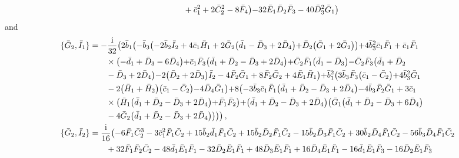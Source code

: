 \documentclass[10pt]{amsart}
\theoremstyle{definition}
\theoremstyle{corollary}
\theoremstyle{remark}
\theoremstyle{conclusion}
\begin{document}
\begin{align}
& \hskip 0.7cm+\bar{c}_1^2+2 \bar{C}_2^2-8 \bar{F}_4\bigl)-32 \bar{E}_1 \bar{D}_2 \bar{F}_3-40 \bar{D}_3^2 \bar{G}_1\bigl) \, \end{align} and \begin{align}
\{\bar{G}_2, \bar{I}_1\}&=-\frac{{\rm i}}{32}  \bigl(2 \bar{b}_1 \bigl(-\bar{b}_3 \bigl(-2 \bar{b}_2 \bar{I}_2+4 \bar{c}_1 \bar{H}_1+2 \bar{G}_2 \bigl(\bar{d}_1-\bar{D}_3+2 \bar{D}_4\bigl)+\bar{D}_2 \bigl(\bar{G}_1+2 \bar{G}_2\bigl)\bigl)+4 \bar{b}_3^2 \bar{c}_1 \bar{F}_1+\bar{c}_1 \bar{F}_1 \nonumber \\
& \hskip 0.7cm \times \bigl(-\bar{d}_1+\bar{D}_3-6 \bar{D}_4\bigl)+\bar{c}_1 \bar{F}_3 \bigl(\bar{d}_1+\bar{D}_2-\bar{D}_3+2 \bar{D}_4\bigl)+\bar{C}_2 \bar{F}_1 \bigl(\bar{d}_1-\bar{D}_3\bigl)-\bar{C}_2 \bar{F}_3\bigl(\bar{d}_1+\bar{D}_2 \nonumber \\
& \hskip 0.7cm -\bar{D}_3+2 \bar{D}_4\bigl)-2 \bigl(\bar{D}_2+2 \bar{D}_3\bigl) \bar{I}_2-4 \bar{F}_2 \bar{G}_1+8 \bar{F}_2 \bar{G}_2+4 \bar{E}_1 \bar{H}_1\bigl)+\bar{b}_1^2 \bigl(3 \bar{b}_3 \bar{F}_3 \bigl(\bar{c}_1-\bar{C}_2\bigl)+4 \bar{b}_3^2 \bar{G}_1 \nonumber \\
& \hskip 0.7cm -2 \bigl(\bar{H}_1+\bar{H}_2\bigl) \bigl(\bar{c}_1-\bar{C}_2\bigl)-4 \bar{D}_4 \bar{G}_1\bigl)+8 \bigl(-3 \bar{b}_3 \bar{c}_1 \bar{F}_1 \bigl(\bar{d}_1+\bar{D}_2-\bar{D}_3+2 \bar{D}_4\bigl)-4 \bar{b}_3 \bar{F}_2 \bar{G}_1+3 \bar{c}_1 \nonumber \\
& \hskip 0.7cm \times \bigl(\bar{H}_1 \bigl(\bar{d}_1+\bar{D}_2-\bar{D}_3+2 \bar{D}_4\bigl)+\bar{F}_1 \bar{F}_2\bigl)+\bigl(\bar{d}_1+\bar{D}_2-\bar{D}_3+2 \bar{D}_4\bigl) \bigl(\bar{G}_1 \bigl(\bar{d}_1+\bar{D}_2-\bar{D}_3+6 \bar{D}_4\bigl)\nonumber \\
& \hskip 0.7cm -4 \bar{G}_2 \bigl(\bar{d}_1+\bar{D}_2-\bar{D}_3+2 \bar{D}_4\bigl)\bigl)\bigl)\bigl) \, ,\nonumber \\
\{\bar{G}_2, \bar{I}_2\}&=\frac{{\rm i}}{16}  \bigl(-6 \bar{F}_1 \bar{C}_2^3-3 \bar{c}_1^2 \bar{F}_1 \bar{C}_2+15 \bar{b}_2 \bar{d}_1 \bar{F}_1 \bar{C}_2+15 \bar{b}_2 \bar{D}_2 \bar{F}_1 \bar{C}_2-15 \bar{b}_2 \bar{D}_3 \bar{F}_1 \bar{C}_2+30 \bar{b}_2 \bar{D}_4 \bar{F}_1 \bar{C}_2-56 \bar{b}_3 \bar{D}_4 \bar{F}_1 \bar{C}_2\nonumber \\
& \hskip 0.7cm+32 \bar{F}_1 \bar{F}_2 \bar{C}_2-48 \bar{d}_1 \bar{E}_1 \bar{F}_1-32 \bar{D}_2 \bar{E}_1 \bar{F}_1+48 \bar{D}_3 \bar{E}_1 \bar{F}_1+16 \bar{D}_4 \bar{E}_1 \bar{F}_1-16 \bar{d}_1 \bar{E}_1 \bar{F}_3-16 \bar{D}_2 \bar{E}_1 \bar{F}_3\nonumber \\

\end{align}
\end{document}
